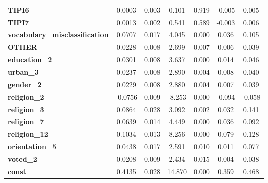 \documentclass{article}[11pt]
\begin{document}
\begin{center}
\begin{tabular}{lcccccc}
\textbf{TIPI6}                         &       0.0003  &        0.003     &     0.101  &         0.919        &       -0.005    &        0.005     \\
\textbf{TIPI7}                         &       0.0013  &        0.002     &     0.541  &         0.589        &       -0.003    &        0.006     \\
\textbf{vocabulary\_misclassification} &       0.0707  &        0.017     &     4.045  &         0.000        &        0.036    &        0.105     \\
\textbf{OTHER}                         &       0.0228  &        0.008     &     2.699  &         0.007        &        0.006    &        0.039     \\
\textbf{education\_2}                  &       0.0301  &        0.008     &     3.637  &         0.000        &        0.014    &        0.046     \\
\textbf{urban\_3}                      &       0.0237  &        0.008     &     2.890  &         0.004        &        0.008    &        0.040     \\
\textbf{gender\_2}                     &       0.0229  &        0.008     &     2.880  &         0.004        &        0.007    &        0.039     \\
\textbf{religion\_2}                   &      -0.0756  &        0.009     &    -8.253  &         0.000        &       -0.094    &       -0.058     \\
\textbf{religion\_3}                   &       0.0864  &        0.028     &     3.092  &         0.002        &        0.032    &        0.141     \\
\textbf{religion\_7}                   &       0.0639  &        0.014     &     4.449  &         0.000        &        0.036    &        0.092     \\
\textbf{religion\_12}                  &       0.1034  &        0.013     &     8.256  &         0.000        &        0.079    &        0.128     \\
\textbf{orientation\_5}                &       0.0438  &        0.017     &     2.591  &         0.010        &        0.011    &        0.077     \\
\textbf{voted\_2}                      &       0.0208  &        0.009     &     2.434  &         0.015        &        0.004    &        0.038     \\
\textbf{const}                         &       0.4135  &        0.028     &    14.870  &         0.000        &        0.359    &        0.468     \\

\end{tabular}
\end{center}
\end{document}
